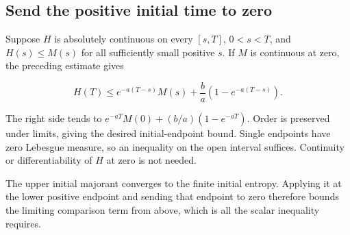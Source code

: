 \documentclass[11pt,a4paper]{report}
\begin{document}
\subsection{\texorpdfstring{Send the positive initial time to zero}{Send the positive initial time to zero}}
\label{report-step-UnadjustedLangevin-LSI-IntegratedEntropy-lean-2}


Suppose \(H\) is absolutely continuous on every \([s,T]\), \(0<s<T\), and \(H(s)\le M(s)\) for all sufficiently small positive \(s\). If \(M\) is continuous at zero, the preceding estimate gives

\[H(T)\le e^{-a(T-s)}M(s)+\frac ba(1-e^{-a(T-s)}).\]

The right side tends to \(e^{-aT}M(0)+(b/a)(1-e^{-aT})\). Order is preserved under limits, giving the desired initial-endpoint bound. Single endpoints have zero Lebesgue measure, so an inequality on the open interval suffices. Continuity or differentiability of \(H\) at zero is not needed.



The upper initial majorant converges to the finite initial entropy. Applying it at the lower positive endpoint and sending that endpoint to zero therefore bounds the limiting comparison term from above, which is all the scalar inequality requires.
\end{document}

